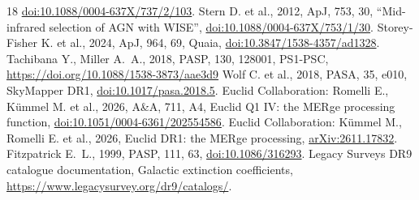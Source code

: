 \documentclass[11pt,a4paper]{article}
\begin{document}
\begin{thebibliography}{18}
  \href{https://doi.org/10.1088/0004-637X/737/2/103}{doi:10.1088/0004-637X/737/2/103}.
 Stern D. et al., 2012, ApJ, 753, 30, ``Mid-infrared selection of AGN with WISE'',
  \href{https://doi.org/10.1088/0004-637X/753/1/30}{doi:10.1088/0004-637X/753/1/30}.
 Storey-Fisher K. et al., 2024, ApJ, 964, 69, Quaia,
  \href{https://doi.org/10.3847/1538-4357/ad1328}{doi:10.3847/1538-4357/ad1328}.
 Tachibana Y., Miller A.~A., 2018, PASP, 130, 128001, PS1-PSC,
  \url{https://doi.org/10.1088/1538-3873/aae3d9}
 Wolf C. et al., 2018, PASA, 35, e010, SkyMapper DR1,
  \href{https://doi.org/10.1017/pasa.2018.5}{doi:10.1017/pasa.2018.5}.
 Euclid Collaboration: Romelli E., K\"ummel M. et al., 2026,
  A\&A, 711, A4, Euclid Q1 IV: the MERge processing function,
  \href{https://doi.org/10.1051/0004-6361/202554586}{doi:10.1051/0004-6361/202554586}.
 Euclid Collaboration: K\"ummel M., Romelli E. et al., 2026,
  Euclid DR1: the MERge processing, \href{https://arxiv.org/abs/2611.17832}{arXiv:2611.17832}.
 Fitzpatrick E.~L., 1999, PASP, 111, 63,
  \href{https://doi.org/10.1086/316293}{doi:10.1086/316293}.
 Legacy Surveys DR9 catalogue documentation, Galactic extinction coefficients,
  \url{https://www.legacysurvey.org/dr9/catalogs/}.
\end{thebibliography}
\end{document}
